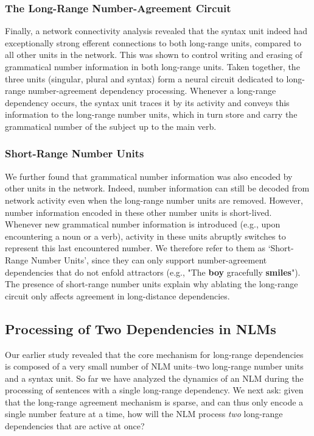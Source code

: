 \subsubsection{The Long-Range Number-Agreement Circuit}
Finally, a network connectivity analysis revealed that the syntax unit indeed had exceptionally strong efferent connections to both long-range units, compared to all other units in the network. This was shown to control writing and erasing of grammatical number information in both long-range units. Taken together, the three units (singular, plural and syntax) form a neural circuit dedicated to long-range number-agreement dependency processing. Whenever a long-range dependency occurs, the syntax unit traces it by its activity and conveys this information to the long-range number units, which in turn store and carry the grammatical number of the subject up to the main verb. 

\subsubsection{Short-Range Number Units}
We further found that grammatical number information was also encoded
by other units in the network. Indeed, number information can still be
decoded from network activity even when the long-range number units
are removed. However, number information encoded in these other number
units is short-lived. Whenever new grammatical number information is
introduced (e.g., upon encountering a noun or a verb), activity in
these units abruptly switches to represent this last encountered
number. We therefore refer to them as `Short-Range Number Units',
since they can only support number-agreement dependencies that do not
enfold attractors (e.g., "The \textbf{boy} gracefully
\textbf{smiles}"). The presence of short-range number units explain
why ablating the long-range circuit only affects agreement in long-distance dependencies.

\subsection{Processing of Two Dependencies in NLMs}
Our earlier study revealed that the core mechanism for long-range dependencies is composed of a very small number of NLM units--two long-range number units and a syntax unit. So far we have analyzed the dynamics of an NLM during the processing of sentences with a single long-range dependency. We next ask: given that the long-range agreement mechanism is sparse, and can thus only encode a single number feature at a time, how will the NLM process \emph{two} long-range dependencies that are active at once?

